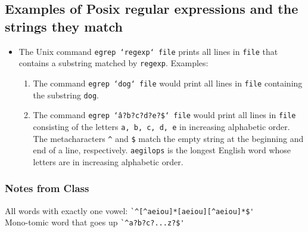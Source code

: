 \documentclass[]{article}
\begin{document}
  \subsection*{Examples of Posix regular expressions and the strings they match}
    \begin{itemize}
      \item The Unix command \texttt{egrep `regexp` file} prints all lines in
            \texttt{file} that contains a substring matched by \texttt{regexp}.
            Examples:
        \begin{enumerate}
          \item The command \texttt{egrep `dog` file} would print all lines in
                \texttt{file} containing the substring \texttt{dog}.
          \item The command \texttt{egrep `\^a?b?c?d?e?\$` file} would print all
                lines in \texttt{file} consisting of the letters \texttt{a, b,
                c, d, e} in increasing alphabetic order. The metacharacters
                \texttt{\^} and \texttt{\$} match the empty string at the
                beginning and end of a line, respectively. \texttt{aegilops} is
                the longest English word whose letters are in increasing
                alphabetic order.
        \end{enumerate}
    \end{itemize}

    \subsubsection*{Notes from Class}
      All words with exactly one vowel:
        \verb|`^[^aeiou]*[aeiou][^aeiou]*$'| \\
        Mono-tomic word that goes up \verb|`^a?b?c?...z?$'|
\end{document}
